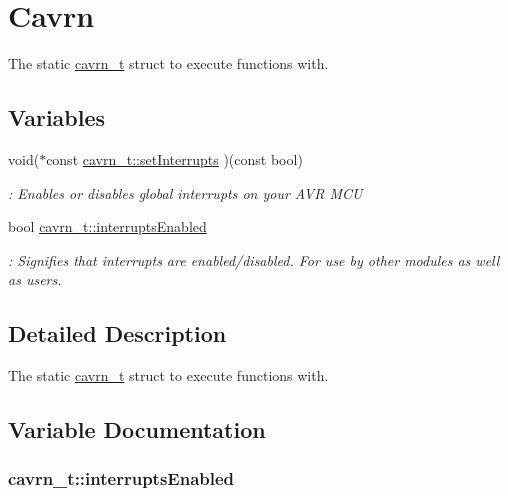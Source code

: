 \hypertarget{a00017}{\section{Cavrn}
\label{a00017}
}


The static \hyperlink{a00006}{cavrn\-\_\-t} struct to execute functions with.  


\subsection*{Variables}
\begin{DoxyCompactItemize}
\item 
void($\ast$const \hyperlink{a00017_ga23b9b26ea99d775a6479518802601749}{cavrn\-\_\-t\-::set\-Interrupts} )(const bool)
\begin{DoxyCompactList}\small\item\em \-: Enables or disables global interrupts on your A\-V\-R M\-C\-U \end{DoxyCompactList}\item 
bool \hyperlink{a00017_gae49f03dd85f90f1079068562dd37163d}{cavrn\-\_\-t\-::interrupts\-Enabled}
\begin{DoxyCompactList}\small\item\em \-: Signifies that interrupts are enabled/disabled. For use by other modules as well as users. \end{DoxyCompactList}\end{DoxyCompactItemize}


\subsection{Detailed Description}
The static \hyperlink{a00006}{cavrn\-\_\-t} struct to execute functions with. 

\subsection{Variable Documentation}
\hypertarget{a00017_gae49f03dd85f90f1079068562dd37163d}{
\subsubsection[{interrupts\-Enabled}]{\setlength{\rightskip}{0pt plus 5cm}cavrn\-\_\-t\-::interrupts\-Enabled}}\label{a00017_gae49f03dd85f90f1079068562dd37163d}


